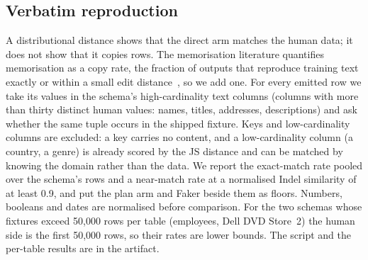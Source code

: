 \documentclass[preprint,12pt]{elsarticle}
\begin{document}
\subsection{Verbatim reproduction}
\label{sec:copy}
A distributional distance shows that the direct arm matches the human data; it does not show that it copies rows. The memorisation literature quantifies memorisation as a copy rate, the fraction of outputs that reproduce training text exactly or within a small edit distance~\cite{carlini2023quantifying,riddell2024contamination}, so we add one. For every emitted row we take its values in the schema's high-cardinality text columns (columns with more than thirty distinct human values: names, titles, addresses, descriptions) and ask whether the same tuple occurs in the shipped fixture. Keys and low-cardinality columns are excluded: a key carries no content, and a low-cardinality column (a country, a genre) is already scored by the JS distance and can be matched by knowing the domain rather than the data. We report the exact-match rate pooled over the schema's rows and a near-match rate at a normalised Indel similarity of at least 0.9, and put the plan arm and Faker beside them as floors. Numbers, booleans and dates are normalised before comparison. For the two schemas whose fixtures exceed 50,000 rows per table (employees, Dell DVD Store~2) the human side is the first 50,000 rows, so their rates are lower bounds. The script and the per-table results are in the artifact.
\end{document}
